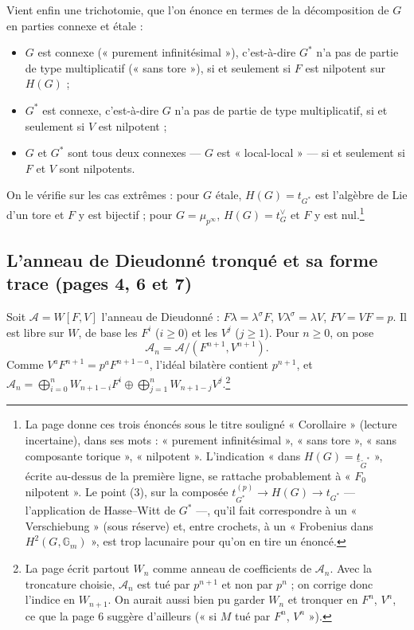 \documentclass[11pt,a4paper]{article}
\begin{document}
Vient enfin une trichotomie, que l'on énonce en termes de la décomposition de
$G$ en parties connexe et étale :
\begin{itemize}
\item $G$ est connexe (« purement infinitésimal »), c'est-à-dire $G^*$ n'a pas
de partie de type multiplicatif (« sans tore »), si et seulement si $F$ est
nilpotent sur $H(G)$ ;
\item $G^*$ est connexe, c'est-à-dire $G$ n'a pas de partie de type
multiplicatif, si et seulement si $V$ est nilpotent ;
\item $G$ et $G^*$ sont tous deux connexes --- $G$ est « local-local » --- si
et seulement si $F$ et $V$ sont nilpotents.
\end{itemize}
On le vérifie sur les cas extrêmes : pour $G$ étale, $H(G) = t_{G^*}$ est
l'algèbre de Lie d'un tore et $F$ y est bijectif ; pour $G = \mu_{p^\infty}$,
$H(G) = t_G^\vee$ et $F$ y est nul.\footnote{La page donne ces trois
énoncés sous le titre souligné « Corollaire » (lecture incertaine), dans ses
mots : « purement infinitésimal », « sans tore », « sans composante
torique », « nilpotent ». L'indication « dans $H(G) = \underline{t}_{\tilde
G^*}$ », écrite au-dessus de la première ligne, se rattache probablement à
« $F_0$ nilpotent ». Le point (3), sur la composée $t_{G^*}^{(p)} \to H(G) \to
t_{G^*}$ --- l'application de Hasse--Witt de $G^*$ ---, qu'il fait
correspondre à un « Verschiebung » (sous réserve) et, entre crochets, à un
« Frobenius dans $H^2(G, \mathbb{G}_m)$ », est trop lacunaire pour qu'on en
tire un énoncé.}

\subsection*{L'anneau de Dieudonné tronqué et sa forme trace (pages 4, 6 et 7)}

Soit $\mathcal{A} = W[F, V]$ l'anneau de Dieudonné : $F\lambda =
\lambda^\sigma F$, $V\lambda^\sigma = \lambda V$, $FV = VF = p$. Il est libre
sur $W$, de base les $F^i$ ($i \geq 0$) et les $V^j$ ($j \geq 1$). Pour $n
\geq 0$, on pose
\[
\mathcal{A}_n = \mathcal{A}/(F^{n+1}, V^{n+1}) .
\]
Comme $V^a F^{n+1} = p^a F^{n+1-a}$, l'idéal bilatère contient $p^{n+1}$, et
$\mathcal{A}_n = \bigoplus_{i=0}^n W_{n+1-i} F^i \oplus \bigoplus_{j=1}^n
W_{n+1-j} V^j$.\footnote{La page écrit partout $W_n$ comme anneau de
coefficients de $\mathcal{A}_n$. Avec la troncature choisie, $\mathcal{A}_n$
est tué par $p^{n+1}$ et non par $p^n$ ; on corrige donc l'indice en $W_{n+1}$.
On aurait aussi bien pu garder $W_n$ et tronquer en $F^n$, $V^n$, ce que la
page 6 suggère d'ailleurs (« si $M$ tué par $F^n$, $V^n$ »).}
\end{document}
